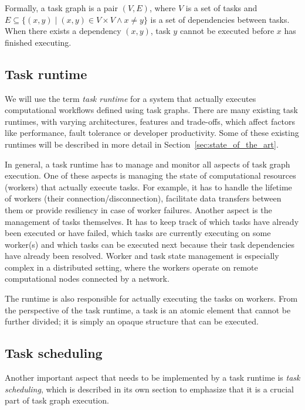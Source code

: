 Formally, a task graph is a pair $(V, E)$, where $V$ is a set of
tasks and $E \subseteq \{(x, y) \mid (x, y) \in V\times{}V \land x \neq y \}$ is a set of dependencies between tasks. When there exists a
dependency $(x, y)$, task $y$ cannot be executed before
$x$ has finished executing.



\subsection{Task runtime}
We will use the term \emph{task runtime} for a system that actually executes computational
workflows defined using task graphs. There are many existing task runtimes, with varying
architectures, features and trade-offs, which affect factors like performance, fault tolerance or
developer productivity. Some of these existing runtimes will be described in more detail in
Section~\ref{sec:state_of_the_art}.

In general, a task runtime has to manage and monitor all aspects of task graph execution. One of
these aspects is managing the state of computational resources (workers) that actually execute
tasks. For example, it has to handle the lifetime of workers (their connection/disconnection),
facilitate data transfers between them or provide resiliency in case of worker failures. Another
aspect is the management of tasks themselves. It has to keep track of which tasks have already been
executed or have failed, which tasks are currently executing on some worker(s) and which tasks can
be executed next because their task dependencies have already been resolved. Worker and task state
management is especially complex in a distributed setting, where the workers operate on remote
computational nodes connected by a network.

The runtime is also responsible for actually executing the tasks on workers. From the perspective
of the task runtime, a task is an atomic element that cannot be further divided; it is simply an
opaque structure that can be executed.

\subsection{Task scheduling}
Another important aspect that needs to be implemented by a task runtime is \emph{task scheduling},
which is described in its own section to emphasize that it is a crucial part of task graph
execution.

